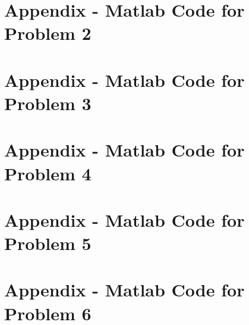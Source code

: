 {{{{\newpage
\section{Appendix - Matlab Code for Problem 2}
\label{appendix:problem2}




\newpage
\section{Appendix - Matlab Code for Problem 3}
\label{appendix:problem3}




\newpage
\section{Appendix - Matlab Code for Problem 4}
\label{appendix:problem4}




\newpage
\section{Appendix - Matlab Code for Problem 5}
\label{appendix:problem5}




\newpage
\section{Appendix - Matlab Code for Problem 6}
\label{appendix:problem6}












}}}}
